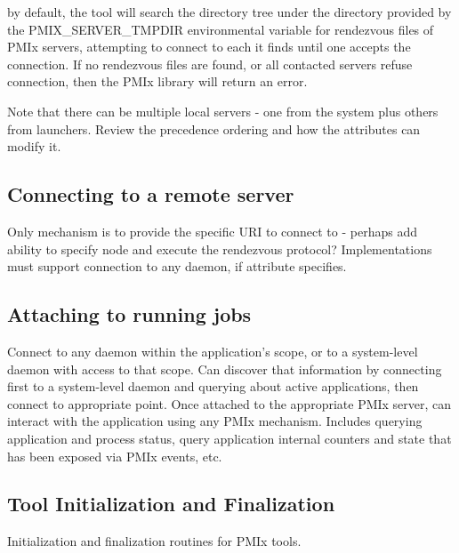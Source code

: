 by default, the tool will search the directory tree under the directory provided by the PMIX_SERVER_TMPDIR environmental variable for rendezvous files of PMIx servers, attempting to connect to each it finds until one accepts the connection. If no rendezvous files are found, or all contacted servers refuse connection, then the PMIx library will return an error.

Note that there can be multiple local servers - one from the system plus others from launchers. Review the precedence ordering and how the attributes can modify it.


\subsection{Connecting to a remote server}

Only mechanism is to provide the specific URI to connect to - perhaps add ability to specify node and execute the rendezvous protocol? Implementations must support connection to any daemon, if attribute specifies.


\subsection{Attaching to running jobs}

Connect to any daemon within the application's scope, or to a system-level daemon with access to that scope. Can discover that information by connecting first to a system-level daemon and querying about active applications, then connect to appropriate point. Once attached to the appropriate PMIx server, can interact with the application using any PMIx mechanism. Includes querying application and process status, query application internal counters and state that has been exposed via PMIx events, etc.

\subsection{Tool Initialization and Finalization}
\label{chap:tools:init}

Initialization and finalization routines for \ac{PMIx} tools.

\subsubsection{}

